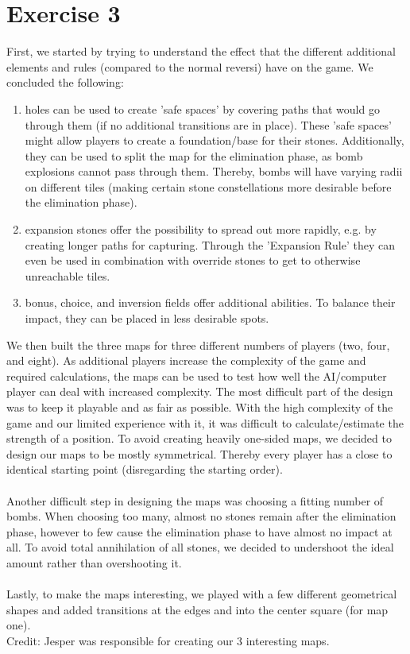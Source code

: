 \section{Exercise 3}
First, we started by trying to understand the effect that the different additional elements and rules (compared to the normal reversi) have on the game. We concluded the following:
\begin{enumerate}
    \item holes can be used to create 'safe spaces' by covering paths that would go through them (if no additional transitions are in place). These 'safe spaces' might allow players to create a foundation/base for their stones. Additionally, they can be used to split the map for the elimination phase, as bomb explosions cannot pass through them. Thereby, bombs will have varying radii on different tiles (making certain stone constellations more desirable before the elimination phase).
    \item expansion stones offer the possibility to spread out more rapidly, e.g. by creating longer paths for capturing. Through the 'Expansion Rule' they can even be used in combination with override stones to get to otherwise unreachable tiles.
    \item bonus, choice, and inversion fields offer additional abilities. To balance their impact, they can be placed in less desirable spots.
\end{enumerate}
We then built the three maps for three different numbers of players (two, four, and eight). As additional players increase the complexity of the game and required calculations, the maps can be used to test how well the AI/computer player can deal with increased complexity.
The most difficult part of the design was to keep it playable and as fair as possible. With the high complexity of the game and our limited experience with it, it was difficult to calculate/estimate the strength of a position. To avoid creating heavily one-sided maps, we decided to design our maps to be mostly symmetrical. Thereby every player has a close to identical starting point (disregarding the starting order).\\\\
Another difficult step in designing the maps was choosing a fitting number of bombs. When choosing too many, almost no stones remain after the elimination phase, however to few cause the elimination phase to have almost no impact at all. To avoid total annihilation of all stones, we decided to undershoot the ideal amount rather than overshooting it.\\\\
Lastly, to make the maps interesting, we played with a few different geometrical shapes and added transitions at the edges and into the center square (for map one).\\
Credit: Jesper was responsible for creating our 3 interesting maps.
